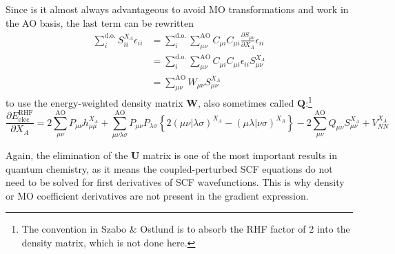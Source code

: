 \documentclass[%
class = book,%
crop = false,%
float = true,%
multi = true,%
preview = false,%
]{standalone}
\begin{document}
Since is it almost always advantageous to avoid MO transformations and work in the AO basis, the last term can be rewritten
\begin{equation}
  \tag{Yamaguchi eq. 4.24}
  \begin{aligned}
    \sum_{i}^{\text{d.o.}} S_{ii}^{X_{A}} \epsilon_{ii} &= \sum_{i}^{\text{d.o.}} \sum_{\mu\nu}^{\text{AO}} C_{\mu i} C_{\mu i} \frac{\partial S_{\mu\nu}}{\partial X_{A}} \epsilon_{ii} \\
    &= \sum_{i}^{\text{d.o.}} \sum_{\mu\nu}^{\text{AO}} C_{\mu i} C_{\mu i} \epsilon_{ii} S_{\mu\nu}^{X_{A}} \\
    &= \sum_{\mu\nu}^{\text{AO}} W_{\mu\nu} S_{\mu\nu}^{X_{A}}
  \end{aligned}
\end{equation}
to use the energy-weighted density matrix \(\mathbf{W}\), also sometimes called \(\mathbf{Q}\):\footnote{The convention in Szabo \& Ostlund is to absorb the RHF factor of 2 into the density matrix, which is not done here.}
\begin{equation}
  \label{eq:szabo-c12}
  \tag{Szabo \& Ostlund eq. C.12}
  \frac{\partial E_{\text{elec}}^{\text{RHF}}}{\partial X_{A}} = 2 \sum_{\mu\nu}^{\text{AO}} P_{\mu\nu} h_{\mu\mu}^{X_{A}} + \sum_{\mu\nu\lambda\sigma}^{\text{AO}} P_{\mu\nu}P_{\lambda\sigma} \left\{ 2(\mu\nu|\lambda\sigma)^{X_{A}} - (\mu\lambda|\nu\sigma)^{X_{A}} \right\} - 2 \sum_{\mu\nu}^{\text{AO}} Q_{\mu\nu} S_{\mu\nu}^{X_{A}} + V_{NN}^{X_{A}}
\end{equation}

Again, the elimination of the \(\mathbf{U}\) matrix is one of the most important results in quantum chemistry, as it means the coupled-perturbed SCF equations do not need to be solved for first derivatives of SCF wavefunctions. This is why density or MO coefficient derivatives are not present in the gradient expression.
\end{document}
